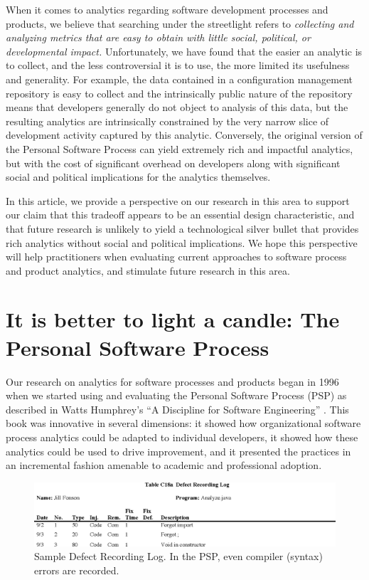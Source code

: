 \documentclass[]{article}
\begin{document}
When it comes to analytics regarding software development processes and products, we
believe that searching under the streetlight refers to {\em collecting and analyzing
  metrics that are easy to obtain with little social, political, or developmental impact.}
Unfortunately, we have found that the easier an analytic is to collect, and the less
controversial it is to use, the more limited its usefulness and generality.  For example,
the data contained in a configuration management repository is easy to collect and the
intrinsically public nature of the repository means that developers generally do not
object to analysis of this data, but the resulting analytics are intrinsically
constrained by the very narrow slice of development activity captured by this
analytic. Conversely, the original version of the Personal Software Process can yield
extremely rich and impactful analytics, but with the cost of significant overhead on
developers along with significant social and political implications for the analytics
themselves.

In this article, we provide a perspective on our research in this area to support our
claim that this tradeoff appears to be an essential design characteristic, and that future
research is unlikely to yield a technological silver bullet that provides rich analytics
without social and political implications.  We hope this perspective will help
practitioners when evaluating current approaches to software process and product
analytics, and stimulate future research in this area.


\section{It is better to light a candle: The Personal Software Process}

Our research on analytics for software processes and products began in 1996 when we
started using and evaluating the Personal Software Process (PSP) as described in Watts
Humphrey's ``A Discipline for Software Engineering'' \cite{Humphrey95}. This book was
innovative in several dimensions: it showed how organizational software process analytics
could be adapted to individual developers, it showed how these analytics could be used to
drive improvement, and it presented the practices in an incremental fashion amenable to
academic and professional adoption.

\begin{figure}[!tb]
\centering
\includegraphics[width=0.95\columnwidth]{defects.eps}
\caption{Sample Defect Recording Log. In the PSP, even compiler (syntax) errors are recorded.}
\label{fig:defect-log}
\end{figure}
 
\end{document}
